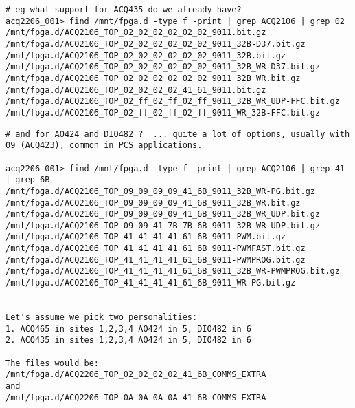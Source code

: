 \documentclass[]{article}
\begin{document}
\begin{lstlisting}[style=bashstyle,frame=single]
# eg what support for ACQ435 do we already have?
acq2206_001> find /mnt/fpga.d -type f -print | grep ACQ2106 | grep 02
/mnt/fpga.d/ACQ2106_TOP_02_02_02_02_02_02_9011.bit.gz
/mnt/fpga.d/ACQ2106_TOP_02_02_02_02_02_02_9011_32B-D37.bit.gz
/mnt/fpga.d/ACQ2106_TOP_02_02_02_02_02_02_9011_32B.bit.gz
/mnt/fpga.d/ACQ2106_TOP_02_02_02_02_02_02_9011_32B_WR-D37.bit.gz
/mnt/fpga.d/ACQ2106_TOP_02_02_02_02_02_02_9011_32B_WR.bit.gz
/mnt/fpga.d/ACQ2106_TOP_02_02_02_02_41_61_9011.bit.gz
/mnt/fpga.d/ACQ2106_TOP_02_ff_02_ff_02_ff_9011_32B_WR_UDP-FFC.bit.gz
/mnt/fpga.d/ACQ2106_TOP_02_ff_02_ff_02_ff_9011_WR_32B-FFC.bit.gz
\end{lstlisting}

\begin{lstlisting}[style=bashstyle,frame=single]
# and for AO424 and DIO482 ?  ... quite a lot of options, usually with 09 (ACQ423), common in PCS applications.

acq2206_001> find /mnt/fpga.d -type f -print | grep ACQ2106 | grep 41 | grep 6B
/mnt/fpga.d/ACQ2106_TOP_09_09_09_09_41_6B_9011_32B_WR-PG.bit.gz
/mnt/fpga.d/ACQ2106_TOP_09_09_09_09_41_6B_9011_32B_WR.bit.gz
/mnt/fpga.d/ACQ2106_TOP_09_09_09_09_41_6B_9011_32B_WR_UDP.bit.gz
/mnt/fpga.d/ACQ2106_TOP_09_09_41_7B_7B_6B_9011_32B_WR_UDP.bit.gz
/mnt/fpga.d/ACQ2106_TOP_41_41_41_41_61_6B_9011-PWM.bit.gz
/mnt/fpga.d/ACQ2106_TOP_41_41_41_41_61_6B_9011-PWMFAST.bit.gz
/mnt/fpga.d/ACQ2106_TOP_41_41_41_41_61_6B_9011-PWMPROG.bit.gz
/mnt/fpga.d/ACQ2106_TOP_41_41_41_41_61_6B_9011_32B_WR-PWMPROG.bit.gz
/mnt/fpga.d/ACQ2106_TOP_41_41_41_41_61_6B_9011_WR-PG.bit.gz


Let's assume we pick two personalities:
1. ACQ465 in sites 1,2,3,4 AO424 in 5, DIO482 in 6
2. ACQ435 in sites 1,2,3,4 AO424 in 5, DIO482 in 6

The files would be:
/mnt/fpga.d/ACQ2206_TOP_02_02_02_02_41_6B_COMMS_EXTRA
and
/mnt/fpga.d/ACQ2206_TOP_0A_0A_0A_0A_41_6B_COMMS_EXTRA
\end{lstlisting}
\end{document}
